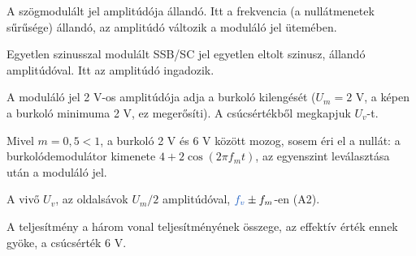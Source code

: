 A szögmodulált jel amplitúdója állandó. Itt a frekvencia (a nullátmenetek sűrűsége) állandó, az amplitúdó változik a moduláló jel ütemében.

Egyetlen szinusszal modulált SSB/SC jel egyetlen eltolt szinusz, állandó amplitúdóval. Itt az amplitúdó ingadozik.

A moduláló jel 2 V-os amplitúdója adja a burkoló kilengését ($U_m=2$ V, a képen a burkoló minimuma 2 V, ez megerősíti). A csúcsértékből megkapjuk $U_v$-t.

\begin{center}\end{center}

\begin{center}\end{center}

\begin{center}\end{center}

Mivel $m=0{,}5<1$, a burkoló 2 V és 6 V között mozog, sosem éri el a nullát: a burkolódemodulátor kimenete $4+2\cos(2\pi f_mt)$, az egyenszint leválasztása után a moduláló jel.

A vivő $U_v$, az oldalsávok $U_m/2$ amplitúdóval, ${\ca{f_v}}\pm f_m$-en (A2).

\begin{center}\end{center}

\begin{center}\end{center}

A teljesítmény a három vonal teljesítményének összege, az effektív érték ennek gyöke, a csúcsérték 6 V.


